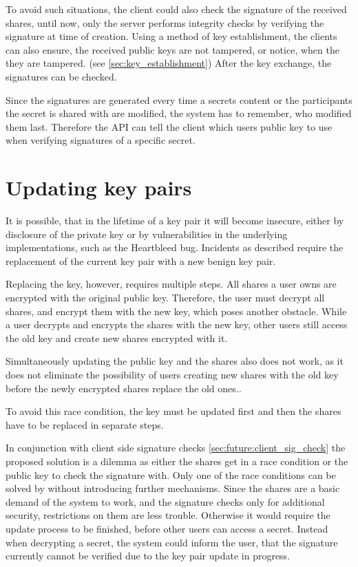 To avoid such situations, the client could also check the signature of the
received shares, until now, only the server performs integrity checks by
verifying the signature at time of creation. Using a method of key
establishment, the clients can also ensure, the received public keys are not
tampered, or notice, when the they are tampered. (see
\ref{sec:key_establishment}) After the key exchange, the signatures can be
checked.

Since the signatures are generated every time a secrets content or the
participants the secret is shared with are modified, the system has to
remember, who modified them last. Therefore the API can tell the client which
users public key to use when verifying signatures of a specific secret.

\section{Updating key pairs}
\label{sec:update_key_pair}

It is possible, that in the lifetime of a key pair it will become insecure,
either by disclosure of the private key or by vulnerabilities in the underlying
implementations, such as the Heartbleed bug. Incidents as described require
the replacement of the current key pair with a new benign key pair.

Replacing the key, however, requires multiple steps. All shares a user owns are
encrypted with the original public key. Therefore, the user must decrypt all
shares, and encrypt them with the new key, which poses another obstacle. While
a user decrypts and encrypts the shares with the new key, other users still
access the old key and create new shares encrypted with it.

Simultaneously updating the public key and the shares also does not work, as it
does not eliminate the possibility of users creating new shares with the old key
before the newly encrypted shares replace the old ones..

To avoid this race condition, the key must be updated first and then the shares
have to be replaced in separate steps.

In conjunction with client side signature checks
\ref{sec:future:client_sig_check} the proposed solution is a dilemma as either
the shares get in a race condition or the public key to check the signature
with. Only one of the race conditions can be solved by without introducing
further mechanisms. Since the shares are a basic demand of the system to work,
and the signature checks only for additional security, restrictions on them are
less trouble. Otherwise it would require the update process to be finished,
before other users can access a secret. Instead when decrypting a secret, the
system could inform the user, that the signature currently cannot be verified
due to the key pair update in progress.

